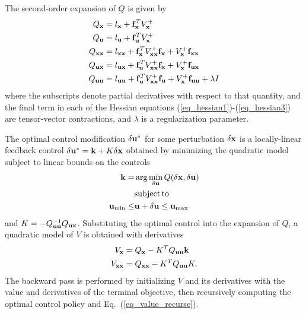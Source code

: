 The second-order expansion of $ Q $ is given by
\begin{align}
	Q_{\mathbf{x}} &= l_{\mathbf{x}} + \mathbf{f}_{\mathbf{x}}^T V^+_{\mathbf{x}} \\
	Q_{\mathbf{u}} &= l_{\mathbf{u}} + \mathbf{f}_{\mathbf{u}}^T V^+_{\mathbf{x}} \\
	Q_{\mathbf{x}\mathbf{x}} &= l_{\mathbf{x}\mathbf{x}} + \mathbf{f}_{\mathbf{x}}^T V^+_{\mathbf{x}\mathbf{x}}\mathbf{f}_{\mathbf{x}} + V^+_{\mathbf{x}} \mathbf{f}_{\mathbf{x}\mathbf{x}} \label{eq_hessian1}\\
	Q_{\mathbf{u}\mathbf{x}} &= l_{\mathbf{u}\mathbf{x}} + \mathbf{f}_{\mathbf{u}}^T V^+_{\mathbf{x}\mathbf{x}}\mathbf{f}_{\mathbf{x}} + V^+_{\mathbf{x}} \mathbf{f}_{\mathbf{u}\mathbf{x}} \label{eq_hessian2}\\
	Q_{\mathbf{u}\mathbf{u}} &= l_{\mathbf{u}\mathbf{u}} + \mathbf{f}_{\mathbf{u}}^T V^+_{\mathbf{x}\mathbf{x}}\mathbf{f}_{\mathbf{u}} + V^+_{\mathbf{x}} \mathbf{f}_{\mathbf{u}\mathbf{u}} +\lambda I \label{eq_hessian3}
\end{align}
where the subscripts denote partial derivatives with respect to that quantity, and the final term in each of the Hessian equations (\ref{eq_hessian1})-(\ref{eq_hessian3}) are tensor-vector contractions, and $ \lambda $ is a regularization parameter.  %

The optimal control modification $\delta\mathbf{u}^*$ for some perturbation $\delta\mathbf{x}$ is a locally-linear feedback control $\delta\mathbf{u}^* = \mathbf{k} + K\delta\mathbf{x}$ obtained by minimizing the quadratic model subject to linear bounds on the controls
\begin{align}
	\mathbf{k} = &\arg\min_{\delta\mathbf{u}} Q(\delta\mathbf{x},\delta\mathbf{u}) \\
	&\mathrm{subject\,to\,\;} \nonumber\\
	\mathbf{u}_{\min}\le &\mathbf{u}+\delta\mathbf{u} \le\mathbf{u}_{\max}
\end{align}
and $K = -Q_{\mathbf{u}\mathbf{u}}^{-1}Q_{\mathbf{u}\mathbf{x}}$. Substituting the optimal control into the expansion of $Q$, a quadratic model of $V$ is obtained with derivatives
\begin{align}
	\begin{split}
		\label{eq_value_recurse}
		V_{\mathbf{x}} &= Q_{\mathbf{x}}- K^TQ_{\mathbf{u}\mathbf{u}}\mathbf{k}\\
		V_{\mathbf{x}\mathbf{x}} &= Q_{\mathbf{x}\mathbf{x}} - K^TQ_{\mathbf{u}\mathbf{u}}K.
	\end{split}
\end{align}
The backward pass is performed by initializing $V$ and its derivatives with the value and derivatives of the terminal objective, then recursively computing the optimal control policy and Eq.~(\ref{eq_value_recurse}). 

